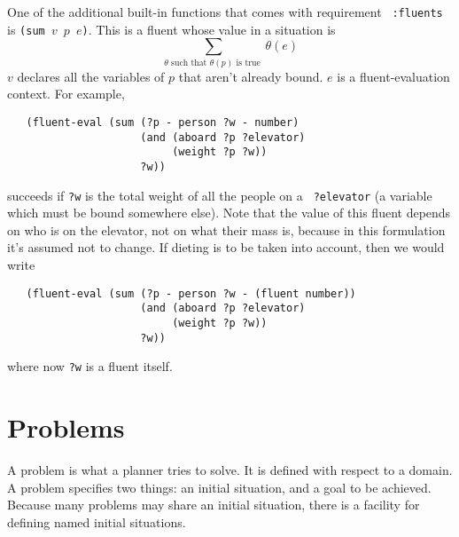 One of the additional built-in functions that comes with requirement {\tt
:fluents} is {\tt (sum $v$ $p$ $e$)}.  This is a fluent whose value in
a situation is 
$$\sum_{\theta \mbox{\ such that\ } \theta(p) \mbox{\ is true\ }}\theta(e)$$ 
$v$ declares all the variables of $p$ that aren't already bound.  $e$
is a fluent-evaluation context.  For
example,
\begin{verbatim}
   (fluent-eval (sum (?p - person ?w - number)
                     (and (aboard ?p ?elevator)
                          (weight ?p ?w))
                     ?w))
\end{verbatim}
succeeds if {\tt ?w} is the total weight of all the people on a {\tt
?elevator} (a variable which must be bound somewhere else).  Note that
the value of this fluent depends on who is on the elevator, not on
what their mass is, because in this formulation it's assumed not to
change.  If dieting is to be taken into account, then we would write
\begin{verbatim}
   (fluent-eval (sum (?p - person ?w - (fluent number))
                     (and (aboard ?p ?elevator)
                          (weight ?p ?w))
                     ?w))
\end{verbatim}
where now {\tt ?w} is a fluent itself.

\section{Problems}

A problem is what a planner tries to solve.  It is defined with
respect to a domain.  A problem specifies two things: an initial
situation, and a goal to be achieved.  Because many problems may share
an initial situation, there is a facility for defining named initial
situations.

